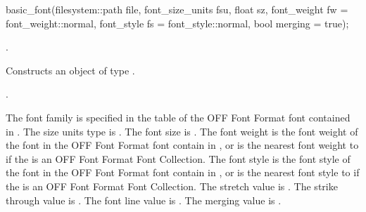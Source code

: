 %
\begin{itemdecl}
basic_font(filesystem::path file, font_size_units fsu, float sz, 
  font_weight fw = font_weight::normal, font_style fs = font_style::normal, 
  bool merging = true);
\end{itemdecl}
\begin{itemdescr}
\pnum
\requires {}.

\pnum
\effects Constructs an object of type .

\pnum
\postconditions {}.

\pnum
\remarks The font family is specified in the  table of the OFF Font Format font contained in . The size units type is . The font size is . The font weight is the font weight of the font in the OFF Font Format font contain in , or is the nearest font weight to  if the  is an OFF Font Format Font Collection. The font style is the font style of the font in the OFF Font Format font contain in , or is the nearest font style to  if the  is an OFF Font Format Font Collection. The stretch value is . The strike through value is . The font line value is . The merging value is .
\end{itemdescr}

